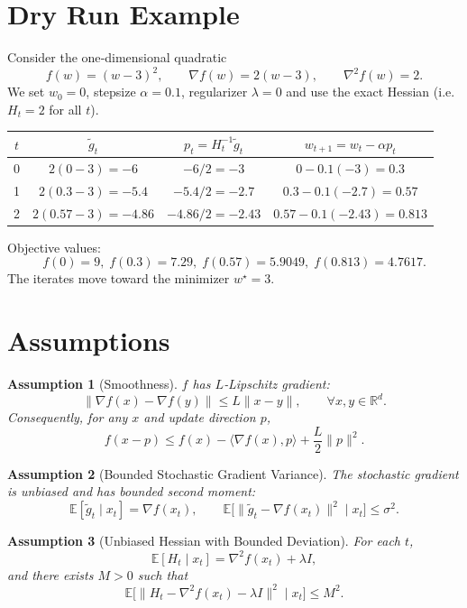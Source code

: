 \documentclass{article}
\newtheorem{assumption}{Assumption}
\newcommand{\E}{\mathbb{E}}
\newcommand{\R}{\mathbb{R}}
\begin{document}
\section*{Dry Run Example}
Consider the one‑dimensional quadratic
\[
f(w)=(w-3)^2,\qquad \nabla f(w)=2(w-3),\qquad \nabla^{2} f(w)=2.
\]
We set $w_0=0$, stepsize $\alpha=0.1$, regularizer $\lambda=0$ and use the exact Hessian
(i.e. $H_t=2$ for all $t$).  

\begin{center}
\begin{tabular}{c|c|c|c}
$t$ & $\tilde g_t$ & $p_t=H_t^{-1}\tilde g_t$ & $w_{t+1}=w_t-\alpha p_t$ \\ \hline
0 & $2(0-3)=-6$ & $-6/2=-3$ & $0-0.1(-3)=0.3$ \\
1 & $2(0.3-3)=-5.4$ & $-5.4/2=-2.7$ & $0.3-0.1(-2.7)=0.57$ \\
2 & $2(0.57-3)=-4.86$ & $-4.86/2=-2.43$ & $0.57-0.1(-2.43)=0.813$ \\
\end{tabular}
\end{center}

Objective values:
\[
f(0)=9,\; f(0.3)=7.29,\; f(0.57)=5.9049,\; f(0.813)=4.7617.
\]
The iterates move toward the minimizer $w^{\star}=3$.

\newpage
\section*{Assumptions}
\begin{assumption}[Smoothness]\label{ass:smooth}
$f$ has $L$‑Lipschitz gradient:
\[
\|\nabla f(x)-\nabla f(y)\|\le L\|x-y\|,\qquad\forall x,y\in\R^{d}.
\]
Consequently, for any $x$ and update direction $p$,
\[
f(x-p)\le f(x)-\langle\nabla f(x),p\rangle+\frac{L}{2}\|p\|^{2}.
\tag{A1}
\]
\end{assumption}

\begin{assumption}[Bounded Stochastic Gradient Variance]\label{ass:grad-var}
The stochastic gradient is unbiased and has bounded second moment:
\[
\E[\tilde g_t\mid x_t]=\nabla f(x_t),\qquad
\E\big[\|\tilde g_t-\nabla f(x_t)\|^{2}\mid x_t\big]\le\sigma^{2}.
\tag{A2}
\]
\end{assumption}

\begin{assumption}[Unbiased Hessian with Bounded Deviation]\label{ass:hess}
For each $t$,
\[
\E[H_t\mid x_t]=\nabla^{2} f(x_t)+\lambda I,
\]
and there exists $M>0$ such that
\[
\E\big[\|H_t-\nabla^{2} f(x_t)-\lambda I\|^{2}\mid x_t\big]\le M^{2}.
\tag{A3}
\]
\end{assumption}
\end{document}
